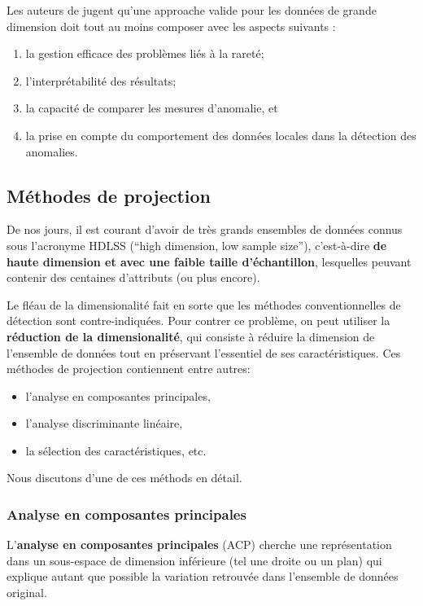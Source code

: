 \noindent Les auteurs de \cite{AYU} jugent qu'une approache valide pour les données de grande dimension doit tout au moins composer avec les aspects suivants \cite{Aurore}:
\begin{enumerate}[noitemsep]
\item la gestion efficace des problèmes liés à la rareté;
\item l'interprétabilité des r\'esultats;
\item la capacit\'e de comparer les mesures d'anomalie, et  
\item la prise en compte du comportement des données locales dans la détection des anomalies.
\end{enumerate}
%

%
\subsection{Méthodes de projection}
%
De nos jours, il est courant d'avoir de très grands ensembles de données connus sous l'acronyme HDLSS (``high dimension, low sample size''), c'est-\`a-dire \textbf{de haute dimension et avec une faible taille d'échantillon}, lesquelles peuvant contenir des centaines d'attributs (ou plus encore). \par Le fl\'eau de la dimensionalit\'e fait en sorte que les méthodes conventionnelles de  détection sont contre-indiqu\'ees. \newl 
Pour contrer ce problème, on peut utiliser la \textbf{r\'eduction de la dimensionalit\'e}, qui consiste à réduire la dimension de l'ensemble de donn\'ees tout en pr\'eservant l'essentiel de ses caractéristiques. Ces m\'ethodes de projection contiennent entre autres: 
\begin{itemize}[noitemsep]
\item l'analyse en composantes principales, 
\item l'analyse discriminante linéaire, 
\item la sélection des caractéristiques, etc. 
\end{itemize}
Nous discutons d'une de ces m\'ethods en d\'etail.%
\subsubsection*{Analyse en composantes principales}
%
L'\textbf{analyse en composantes principales} (ACP) cherche une représentation dans un sous-espace de dimension inférieure (tel une droite ou un plan) qui explique autant que possible la variation retrouv\'ee dans l'ensemble de donn\'ees original. 

